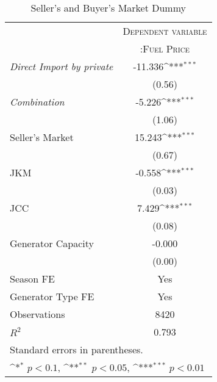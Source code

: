 \documentclass[12pt]{article}
\begin{document}
\begin{table}[htbp]\centering
\def\sym#1{\ifmmode^{#1}\else\(^{#1}\)\fi}
\caption{Seller's and Buyer's Market Dummy\label{tab1}}
\begin{tabular}{l*{1}{c}}
\toprule
 & \multicolumn{1}{c}{\textsc{Dependent variable}} \\ 
                     &\multicolumn{1}{c}{\textsc{:Fuel Price}}\\
                     \addlinespace
\hline \hline
\addlinespace
\textit{Direct Import by private}              &     -11.336\sym{***}\\
                    &      (0.56)         \\
\addlinespace
\textit{Combination} &      -5.226\sym{***}\\
                    &      (1.06)         \\
\addlinespace
Seller's Market          &      15.243\sym{***}\\
                    &      (0.67)         \\
\addlinespace
JKM                 &      -0.558\sym{***}\\
                    &      (0.03)         \\
\addlinespace
JCC                 &       7.429\sym{***}\\
                    &      (0.08)         \\
\addlinespace
Generator Capacity          &      -0.000         \\
                    &      (0.00)         \\
\midrule
Season FE         &    Yes \\
Generator Type FE       &    Yes \\
Observations                   &    8420         \\
$R^2$                   &       0.793         \\
\bottomrule
\multicolumn{2}{l}{\footnotesize Standard errors in parentheses.}\\
\multicolumn{2}{l}{\footnotesize \sym{*} \(p<0.1\), \sym{**} \(p<0.05\), \sym{***} \(p<0.01\)}\\
\end{tabular}
\end{table}
\end{document}
